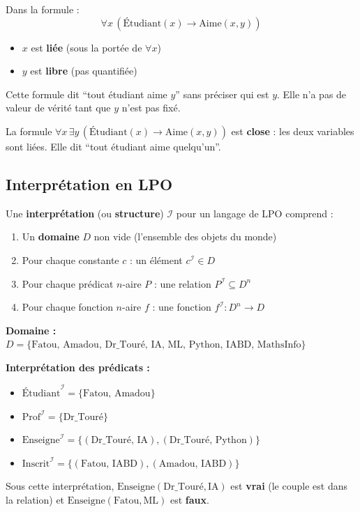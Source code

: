 \documentclass[11pt,a4paper]{article}
\begin{document}
\begin{exemplebox}
Dans la formule :
$$\forall x \, (\text{Étudiant}(x) \rightarrow \text{Aime}(x, y))$$
\begin{itemize}[nosep]
    \item $x$ est \textbf{liée} (sous la portée de $\forall x$)
    \item $y$ est \textbf{libre} (pas quantifiée)
\end{itemize}
Cette formule dit ``tout étudiant aime $y$'' sans préciser qui est $y$. Elle n'a pas de valeur de vérité tant que $y$ n'est pas fixé.

La formule $\forall x \, \exists y \, (\text{Étudiant}(x) \rightarrow \text{Aime}(x, y))$ est \textbf{close} : les deux variables sont liées. Elle dit ``tout étudiant aime quelqu'un''.
\end{exemplebox}

\subsection{Interprétation en LPO}

\begin{definitionbox}
Une \textbf{interprétation} (ou \textbf{structure}) $\mathcal{I}$ pour un langage de LPO comprend :
\begin{enumerate}[nosep]
    \item Un \textbf{domaine} $D$ non vide (l'ensemble des objets du monde)
    \item Pour chaque constante $c$ : un élément $c^{\mathcal{I}} \in D$
    \item Pour chaque prédicat $n$-aire $P$ : une relation $P^{\mathcal{I}} \subseteq D^n$
    \item Pour chaque fonction $n$-aire $f$ : une fonction $f^{\mathcal{I}} : D^n \to D$
\end{enumerate}
\end{definitionbox}

\begin{exemplebox}
\textbf{Domaine :} $D = \{\text{Fatou, Amadou, Dr\_Touré, IA, ML, Python, IABD, MathsInfo}\}$

\textbf{Interprétation des prédicats :}
\begin{itemize}[nosep]
    \item $\text{Étudiant}^{\mathcal{I}} = \{\text{Fatou, Amadou}\}$
    \item $\text{Prof}^{\mathcal{I}} = \{\text{Dr\_Touré}\}$
    \item $\text{Enseigne}^{\mathcal{I}} = \{(\text{Dr\_Touré, IA}), (\text{Dr\_Touré, Python})\}$
    \item $\text{Inscrit}^{\mathcal{I}} = \{(\text{Fatou, IABD}), (\text{Amadou, IABD})\}$
\end{itemize}

Sous cette interprétation, $\text{Enseigne}(\text{Dr\_Touré}, \text{IA})$ est \textbf{vrai} (le couple est dans la relation) et $\text{Enseigne}(\text{Fatou}, \text{ML})$ est \textbf{faux}.
\end{exemplebox}
\end{document}
